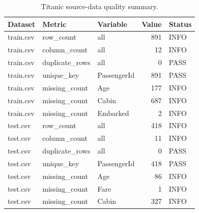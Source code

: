 \begin{table}[htbp]
\centering
\caption{Titanic source-data quality summary.}
\label{tab:data-quality}
\small
\begin{tabular}{lllrl}
\toprule
Dataset & Metric & Variable & Value & Status \\
\midrule
train.csv & row\_count & all & 891 & INFO \\
train.csv & column\_count & all & 12 & INFO \\
train.csv & duplicate\_rows & all & 0 & PASS \\
train.csv & unique\_key & PassengerId & 891 & PASS \\
train.csv & missing\_count & Age & 177 & INFO \\
train.csv & missing\_count & Cabin & 687 & INFO \\
train.csv & missing\_count & Embarked & 2 & INFO \\
test.csv & row\_count & all & 418 & INFO \\
test.csv & column\_count & all & 11 & INFO \\
test.csv & duplicate\_rows & all & 0 & PASS \\
test.csv & unique\_key & PassengerId & 418 & PASS \\
test.csv & missing\_count & Age & 86 & INFO \\
test.csv & missing\_count & Fare & 1 & INFO \\
test.csv & missing\_count & Cabin & 327 & INFO \\
\bottomrule
\end{tabular}
\end{table}
